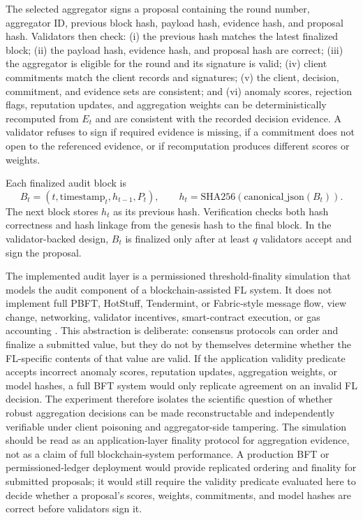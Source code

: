 \documentclass[preprint,12pt]{elsarticle}
\begin{document}
The selected aggregator signs a proposal containing the round number, aggregator ID, previous block hash, payload hash, evidence hash, and proposal hash. Validators then check: (i) the previous hash matches the latest finalized block; (ii) the payload hash, evidence hash, and proposal hash are correct; (iii) the aggregator is eligible for the round and its signature is valid; (iv) client commitments match the client records and signatures; (v) the client, decision, commitment, and evidence sets are consistent; and (vi) anomaly scores, rejection flags, reputation updates, and aggregation weights can be deterministically recomputed from $E_t$ and are consistent with the recorded decision evidence. A validator refuses to sign if required evidence is missing, if a commitment does not open to the referenced evidence, or if recomputation produces different scores or weights.

Each finalized audit block is
\begin{equation}
B_t=(t,\mathrm{timestamp}_t,h_{t-1},P_t), \qquad
h_t=\mathrm{SHA256}(\mathrm{canonical\_json}(B_t)).
\end{equation}
The next block stores $h_t$ as its previous hash. Verification checks both hash correctness and hash linkage from the genesis hash to the final block. In the validator-backed design, $B_t$ is finalized only after at least $q$ validators accept and sign the proposal.

The implemented audit layer is a permissioned threshold-finality simulation that models the audit component of a blockchain-assisted FL system. It does not implement full PBFT, HotStuff, Tendermint, or Fabric-style message flow, view change, networking, validator incentives, smart-contract execution, or gas accounting \citep{castro1999pbft,yin2019hotstuff,buchman2018tendermint,androulaki2018fabric}. This abstraction is deliberate: consensus protocols can order and finalize a submitted value, but they do not by themselves determine whether the FL-specific contents of that value are valid. If the application validity predicate accepts incorrect anomaly scores, reputation updates, aggregation weights, or model hashes, a full BFT system would only replicate agreement on an invalid FL decision. The experiment therefore isolates the scientific question of whether robust aggregation decisions can be made reconstructable and independently verifiable under client poisoning and aggregator-side tampering. The simulation should be read as an application-layer finality protocol for aggregation evidence, not as a claim of full blockchain-system performance. A production BFT or permissioned-ledger deployment would provide replicated ordering and finality for submitted proposals; it would still require the validity predicate evaluated here to decide whether a proposal's scores, weights, commitments, and model hashes are correct before validators sign it.
\end{document}
